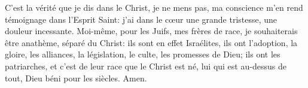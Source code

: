 C’est la vérité que je dis dans le Christ,
	je ne mens pas, ma conscience m’en rend témoignage dans l’Esprit Saint:
	j’ai dans le cœur une grande tristesse, une douleur incessante.
Moi-même, pour les Juifs, mes frères de race,
	je souhaiterais être anathème, séparé du Christ:
	ils sont en effet Israélites, ils ont l’adoption,
	la gloire, les alliances, la législation, le culte, les promesses de Dieu;
	ils ont les patriarches,
	et c’est de leur race que le Christ est né, lui qui est au-dessus de tout,
	Dieu béni pour les siècles. Amen.
